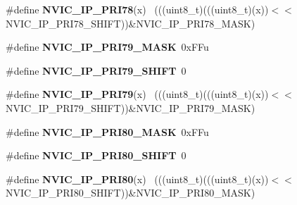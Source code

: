 \begin{DoxyCompactItemize}
\item 
\hypertarget{group___n_v_i_c___register___masks_gaa1cc88d15c719fee654c643e07815aad}{}\#define {\bfseries N\+V\+I\+C\+\_\+\+I\+P\+\_\+\+P\+R\+I78}(x)                                              ~(((uint8\+\_\+t)(((uint8\+\_\+t)(x))$<$$<$N\+V\+I\+C\+\_\+\+I\+P\+\_\+\+P\+R\+I78\+\_\+\+S\+H\+I\+F\+T))\&N\+V\+I\+C\+\_\+\+I\+P\+\_\+\+P\+R\+I78\+\_\+\+M\+A\+S\+K)\label{group___n_v_i_c___register___masks_gaa1cc88d15c719fee654c643e07815aad}

\item 
\hypertarget{group___n_v_i_c___register___masks_gadd30eb93fb665a26a331075c75d34bfd}{}\#define {\bfseries N\+V\+I\+C\+\_\+\+I\+P\+\_\+\+P\+R\+I79\+\_\+\+M\+A\+S\+K}~0x\+F\+Fu\label{group___n_v_i_c___register___masks_gadd30eb93fb665a26a331075c75d34bfd}

\item 
\hypertarget{group___n_v_i_c___register___masks_ga3a4422517518eb985b0dfd670004bb8a}{}\#define {\bfseries N\+V\+I\+C\+\_\+\+I\+P\+\_\+\+P\+R\+I79\+\_\+\+S\+H\+I\+F\+T}~0\label{group___n_v_i_c___register___masks_ga3a4422517518eb985b0dfd670004bb8a}

\item 
\hypertarget{group___n_v_i_c___register___masks_gae9456ec5a61e82e8d53e2b8077fb55e4}{}\#define {\bfseries N\+V\+I\+C\+\_\+\+I\+P\+\_\+\+P\+R\+I79}(x)                                              ~(((uint8\+\_\+t)(((uint8\+\_\+t)(x))$<$$<$N\+V\+I\+C\+\_\+\+I\+P\+\_\+\+P\+R\+I79\+\_\+\+S\+H\+I\+F\+T))\&N\+V\+I\+C\+\_\+\+I\+P\+\_\+\+P\+R\+I79\+\_\+\+M\+A\+S\+K)\label{group___n_v_i_c___register___masks_gae9456ec5a61e82e8d53e2b8077fb55e4}

\item 
\hypertarget{group___n_v_i_c___register___masks_ga29b20caecec5544fac7f91d58dc51fc2}{}\#define {\bfseries N\+V\+I\+C\+\_\+\+I\+P\+\_\+\+P\+R\+I80\+\_\+\+M\+A\+S\+K}~0x\+F\+Fu\label{group___n_v_i_c___register___masks_ga29b20caecec5544fac7f91d58dc51fc2}

\item 
\hypertarget{group___n_v_i_c___register___masks_ga99cc455f505478903213091d13469bb9}{}\#define {\bfseries N\+V\+I\+C\+\_\+\+I\+P\+\_\+\+P\+R\+I80\+\_\+\+S\+H\+I\+F\+T}~0\label{group___n_v_i_c___register___masks_ga99cc455f505478903213091d13469bb9}

\item 
\hypertarget{group___n_v_i_c___register___masks_ga36e5bb3bc6fd015876f51df4ee424533}{}\#define {\bfseries N\+V\+I\+C\+\_\+\+I\+P\+\_\+\+P\+R\+I80}(x)                                              ~(((uint8\+\_\+t)(((uint8\+\_\+t)(x))$<$$<$N\+V\+I\+C\+\_\+\+I\+P\+\_\+\+P\+R\+I80\+\_\+\+S\+H\+I\+F\+T))\&N\+V\+I\+C\+\_\+\+I\+P\+\_\+\+P\+R\+I80\+\_\+\+M\+A\+S\+K)\label{group___n_v_i_c___register___masks_ga36e5bb3bc6fd015876f51df4ee424533}


\end{DoxyCompactItemize}
